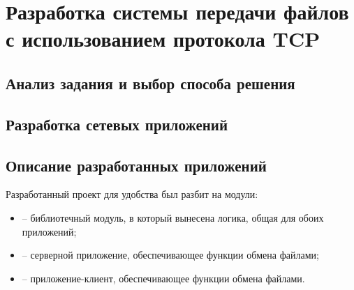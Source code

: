 \newpage

\section{Разработка системы передачи файлов с использованием протокола TCP}

\subsection{Анализ задания и выбор способа решения}



\subsection{Разработка сетевых приложений}


\subsection{Описание разработанных приложений}


Разработанный проект  для удобства был разбит на модули:
\begin{itemize}
	\item {} -- библиотечный модуль, в который вынесена логика, общая для обоих приложений;
	\item {} -- серверной приложение, обеспечивающее функции обмена файлами;
	\item {} -- приложение-клиент, обеспечивающее функции обмена файлами.
\end{itemize}

